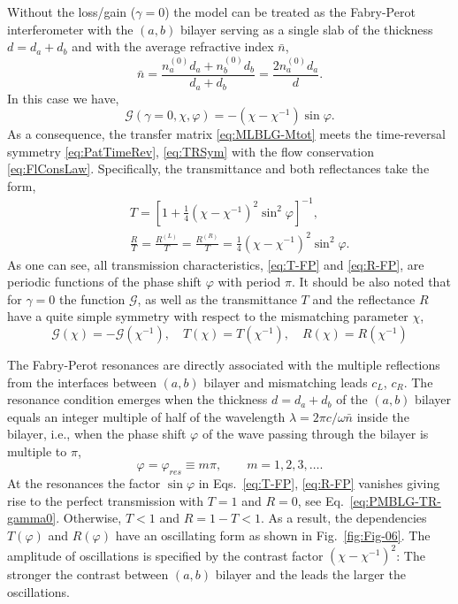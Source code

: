 \documentclass[aps,pra,reprint,showpacs,bibnotes,preprintnumbers,twoside,eqsecnum]{revtex4-1}
\begin{document}
Without the loss/gain ($\gamma=0$) the model can be treated as the Fabry-Perot interferometer with the $(a,b)$ bilayer serving as a single slab of the thickness $d=d_a+d_b$ and with the average refractive index $\bar{n}$,
%
\begin{equation}\label{eq:av-n}
\bar{n}=\frac{n_a^{(0)}d_a+n_b^{(0)}d_b}{d_a+d_b}=\frac{2n_a^{(0)}d_a}{d}.
\end{equation}
In this case we have,
%
\begin{equation}\label{eq:G-FP}
\mathcal{G}(\gamma=0,\chi,\varphi)=-\left(\chi-\chi^{-1}\right)\sin\varphi.
\end{equation}
As a consequence, the transfer matrix \eqref{eq:MLBLG-Mtot} meets the time-reversal symmetry \eqref{eq:PatTimeRev}, \eqref{eq:TRSym} with the flow conservation \eqref{eq:FlConsLaw}. Specifically, the transmittance and both reflectances take the form,
%
\begin{eqnarray}
&&T=\left[1+\frac{1}{4}\left(\chi-\chi^{-1}\right)^2\sin^2\varphi\right]^{-1},\label{eq:T-FP}\\
&&\frac{R}{T}=\frac{R^{(L)}}{T}=\frac{R^{(R)}}{T}=\frac{1}{4}\left(\chi-\chi^{-1}\right)^2\sin^2\varphi.\label{eq:R-FP}
\end{eqnarray}
As one can see, all transmission characteristics, \eqref{eq:T-FP} and \eqref{eq:R-FP}, are periodic functions of the phase shift $\varphi$ with period $\pi$. It should be also noted that for $\gamma=0$ the function $\mathcal{G}$, as well as the transmittance $T$ and the reflectance $R$ have a quite simple symmetry with respect to the mismatching parameter  $\chi$,
%
\begin{equation}\label{eq:FP-Chi-Sym}
\mathcal{G}(\chi)=-\mathcal{G}(\chi^{-1}),\quad T(\chi)=T(\chi^{-1}),\quad R(\chi)=R(\chi^{-1})
\end{equation}

The Fabry-Perot resonances are directly associated with the multiple reflections from the interfaces between $(a,b)$ bilayer and mismatching leads $c_L$, $c_R$. The resonance condition emerges when the thickness $d=d_a+d_b$ of the $(a,b)$ bilayer equals an integer multiple of half of the wavelength $\lambda=2\pi c/\omega\bar{n}$ inside the bilayer, i.e., when the phase shift $\varphi$ of the wave passing through the bilayer is multiple to $\pi$,
%
\begin{equation}\label{eq:FP-res}
\varphi=\varphi_{res}\equiv m\pi,\qquad m=1,2,3,\ldots .
\end{equation}
At the resonances the factor $\sin\varphi$ in Eqs.~\eqref{eq:T-FP}, \eqref{eq:R-FP} vanishes giving rise to the perfect transmission with  $T=1$ and $R=0$, see Eq.~\eqref{eq:PMBLG-TR-gamma0}. Otherwise, $T<1$ and $R=1-T<1$. As a result, the dependencies $T(\varphi)$ and $R(\varphi)$ have an oscillating form as shown in Fig.~\ref{fig:Fig-06}. The amplitude of oscillations is specified by the contrast factor $\left(\chi-\chi^{-1}\right)^2$: The stronger the contrast between $(a,b)$ bilayer and the leads the larger the oscillations.
\end{document}
